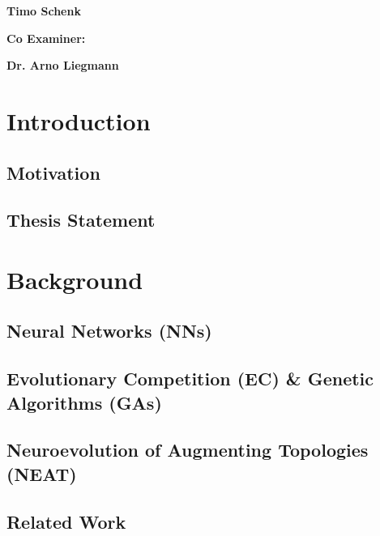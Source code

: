 \documentclass[11pt, a4paper, notitlepage]{report}
\begin{document}
\begin{titelpage}
{\begin{minipage}[t]{0.47\textwidth}
                \end{minipage}
                \hfill
                \begin{minipage}[t]{0.47\textwidth}\raggedleft
                \large \textbf {Timo Schenk}\\
                \end{minipage}
                \begin{minipage}[t]{0.47\textwidth}
                \large \textbf {Co Examiner:}\\
                \end{minipage}
                \hfill
                \begin{minipage}[t]{0.47\textwidth}\raggedleft
                \large \textbf {Dr. Arno Liegmann}\\
                \end{minipage}
                \vfill
            }
        \clearpage
    \end{titelpage}
    \setcounter{page}{2}
    \tableofcontents
    \chapter{Introduction}
        \section{Motivation}
        \section{Thesis Statement}
    \chapter{Background}
        \section{Neural Networks (NNs)}
        \section{Evolutionary Competition (EC) \& Genetic Algorithms (GAs)}
        \section{Neuroevolution of Augmenting Topologies (NEAT)}
        \section{Related Work}
\end{document}
